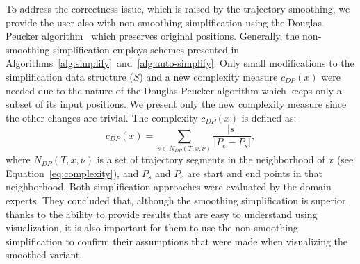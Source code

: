 To address the correctness issue, which is raised by the trajectory smoothing, we provide the user also with non-smoothing simplification using the Douglas-Peucker algorithm~\cite{visvalingam1990douglas} which preserves original positions.
Generally, the non-smoothing simplification employs schemes presented in Algorithms~\ref{alg:simplify}~and~\ref{alg:auto-simplify}.
Only small modifications to the simplification data structure ($S$) and a new complexity measure $c_{DP}(x)$ were needed due to the nature of the Douglas-Peucker algorithm which keeps only a subset of its input positions.
We present only the new complexity measure since the other changes are trivial.
The complexity $c_{DP}(x)$ is defined as:
\begin{equation}
  c_{DP}(x) = \sum_{s \in N_{DP}(T, x, \nu)}{\frac{|s|}{|P_e - P_s|}},
\label{eq:complexity-dp}
\end{equation}
where $N_{DP}(T, x, \nu)$ is a set of trajectory segments in the neighborhood of $x$ (see Equation~\ref{eq:complexity}), and $P_s$ and $P_e$ are start and end points in that neighborhood.
Both simplification approaches were evaluated by the domain experts.
They concluded that, although the smoothing simplification is superior thanks to the ability to provide results that are easy to understand using visualization, it is also important for them to use the non-smoothing simplification to confirm their assumptions that were made when visualizing the smoothed variant.